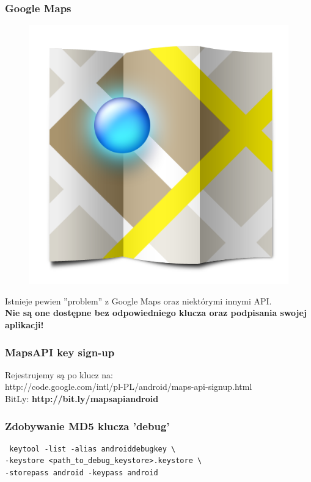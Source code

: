 \documentclass{beamer}
\begin{document}
\begin{frame}\frametitle{Google Maps}

\begin{figure}[tc]
  \centering
  \includegraphics[height=0.45\textheight,keepaspectratio=true]{images/maps_icon}
\end{figure}

Istnieje pewien ''problem'' z Google Maps oraz niektórymi innymi API. \\
\textbf{Nie są one dostępne bez odpowiedniego klucza oraz podpisania swojej aplikacji!}
\end{frame}


\begin{frame}\frametitle{MapsAPI key sign-up}
\begin{center}
  Rejestrujemy są po klucz na: \\
  http://code.google.com/intl/pl-PL/android/maps-api-signup.html \\
  BitLy: \textbf{http://bit.ly/mapsapiandroid}
\end{center}
\end{frame}


\begin{frame}[fragile]\frametitle{Zdobywanie MD5 klucza 'debug'}
\begin{lstlisting}
 keytool -list -alias androiddebugkey \
-keystore <path_to_debug_keystore>.keystore \
-storepass android -keypass android
\end{lstlisting}
\end{frame}
\end{document}

